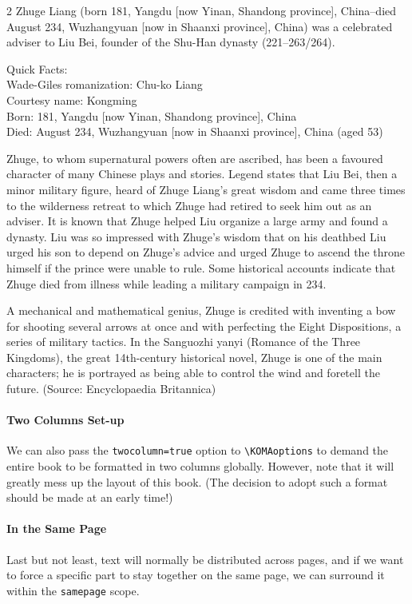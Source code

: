 \begin{multicols}{2}
Zhuge Liang (born 181, Yangdu [now Yinan, Shandong province], China--died August 234, Wuzhangyuan [now in Shaanxi province], China) was a celebrated adviser to Liu Bei, founder of the Shu-Han dynasty (221--263/264).

Quick Facts: \\
Wade-Giles romanization: Chu-ko Liang \\
Courtesy name: Kongming \\
Born: 181, Yangdu [now Yinan, Shandong province], China \\
Died: August 234, Wuzhangyuan [now in Shaanxi province], China (aged 53)

Zhuge, to whom supernatural powers often are ascribed, has been a favoured character of many Chinese plays and stories. Legend states that Liu Bei, then a minor military figure, heard of Zhuge Liang’s great wisdom and came three times to the wilderness retreat to which Zhuge had retired to seek him out as an adviser. It is known that Zhuge helped Liu organize a large army and found a dynasty. Liu was so impressed with Zhuge’s wisdom that on his deathbed Liu urged his son to depend on Zhuge’s advice and urged Zhuge to ascend the throne himself if the prince were unable to rule. Some historical accounts indicate that Zhuge died from illness while leading a military campaign in 234.

A mechanical and mathematical genius, Zhuge is credited with inventing a bow for shooting several arrows at once and with perfecting the Eight Dispositions, a series of military tactics. In the Sanguozhi yanyi (Romance of the Three Kingdoms), the great 14th-century historical novel, Zhuge is one of the main characters; he is portrayed as being able to control the wind and foretell the future. (Source: Encyclopaedia Britannica)
\end{multicols}

\paragraph{Two Columns Set-up} We can also pass the \verb|twocolumn=true| option to \texttt{\textbackslash KOMAoptions} to demand the entire book to be formatted in two columns globally. However, note that it will greatly mess up the layout of this book. (The decision to adopt such a format should be made at an early time!)

\paragraph{In the Same Page}
Last but not least, text will normally be distributed across pages, and if we want to force a specific part to stay together on the same page, we can surround it within the \texttt{samepage} scope.